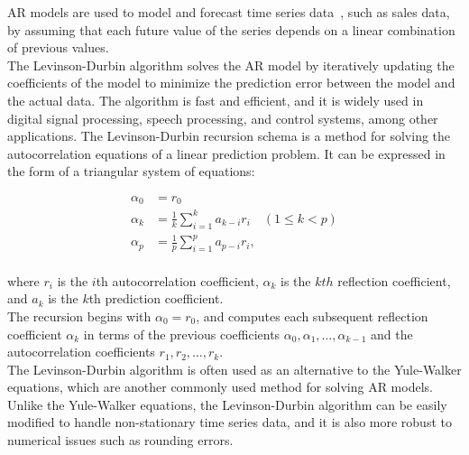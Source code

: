     AR models are used to model and forecast time series data~\cite{Durbin}, such as sales data, by assuming that each future value of the series
    depends on a linear combination of previous values.
    \\
    The Levinson-Durbin algorithm solves the AR model by iteratively updating the coefficients of the model to minimize the prediction
    error between the model and the actual data. The algorithm is fast and efficient, and it is widely used in digital signal processing,
    speech processing, and control systems, among other applications.
    The Levinson-Durbin recursion schema is a method for solving the autocorrelation equations of a linear prediction problem.
    It can be expressed in the form of a triangular system of equations:

    \begin{equation*}
        \begin{aligned}
        \alpha_0 &= r_0 \\
        \alpha_k &= \frac{1}{k} \sum_{i=1}^{k} a_{k-i} r_i \quad (1 \leq k < p) \\
        \alpha_p &= \frac{1}{p} \sum_{i=1}^{p} a_{p-i} r_i,
        \end{aligned}
    \end{equation*}
    \\
    where $r_i$ is the $i$th autocorrelation coefficient, $\alpha_k$ is the $kth$ reflection coefficient, and $a_k$ is the $k$th prediction coefficient.
    \\
    The recursion begins with $\alpha_0 = r_0$, and computes each subsequent reflection coefficient $\alpha_k$ in terms of the previous
    coefficients $\alpha_0, \alpha_1, \ldots, \alpha_{k-1}$ and the autocorrelation coefficients $r_1, r_2, \ldots, r_k$.\\
    The Levinson-Durbin algorithm is often used as an alternative to the Yule-Walker equations, which are another commonly used method for
    solving AR models. Unlike the Yule-Walker equations, the Levinson-Durbin algorithm can be easily modified to handle non-stationary time
    series data, and it is also more robust to numerical issues such as rounding errors.\\
